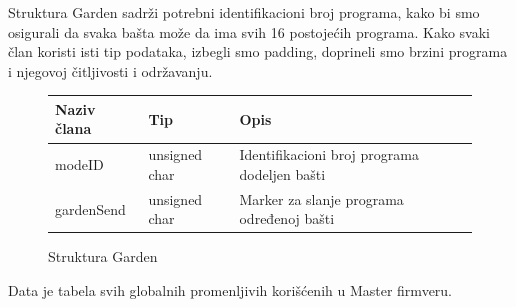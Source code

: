 \documentclass[12pt]{article}
\numberwithin{figure}{section}
\begin{document}
Struktura Garden sadrži potrebni identifikacioni broj programa, kako bi smo osigurali da svaka bašta može da ima svih 16 postojećih programa.
Kako svaki član koristi isti tip podataka, izbegli smo padding, doprineli smo brzini programa i njegovoj čitljivosti i održavanju. \newline

\begin{figure}[ht]
  \caption{Struktura Garden}
  \begin{tabular}{|p{5cm}|p{5cm}|p{5cm}|}
    \hline
    Naziv člana & Tip & Opis \\ 
    \hline
    modeID & unsigned char & Identifikacioni broj programa dodeljen bašti \\
    \hline 
    gardenSend & unsigned char & Marker za slanje programa određenoj bašti \\
    \hline 
  \end{tabular}
\end{figure}

Data je tabela svih globalnih promenljivih korišćenih u Master firmveru.
\end{document}

